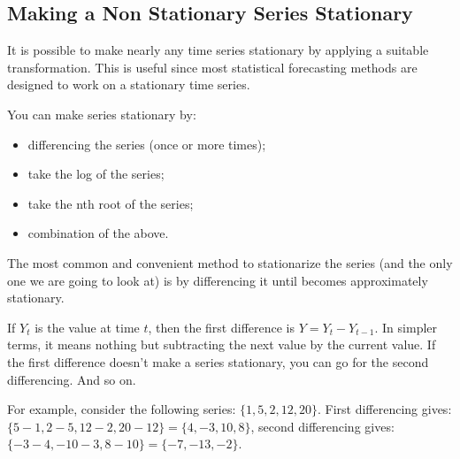 \subsection{Making a Non Stationary Series Stationary}
\label{making-a-non-stationary-series-stationary}

It is possible to make nearly any time series stationary by applying a
suitable transformation. This is useful since most statistical
forecasting methods are designed to work on a stationary time series.

You can make series stationary by:

\begin{itemize}
\tightlist
\item
  differencing the series (once or more times);
\item
  take the log of the series;
\item
  take the nth root of the series;
\item
  combination of the above.
\end{itemize}

The most common and convenient method to stationarize the series (and
the only one we are going to look at) is by differencing it 
until becomes approximately stationary.

If \(Y_t\) is the value at time \(t\), then the first difference is
\(Y = Y_t - Y_{t-1}\). In simpler terms, it means
nothing but subtracting the next value by the current value. If the
first difference doesn't make a series stationary, you can go for the
second differencing. And so on.

For example, consider the following series: $\{1, 5, 2, 12, 20\}$.
First differencing gives: $\{5-1, 2-5, 12-2, 20-12\} = \{4, -3, 10, 8\}$,
second differencing gives: $\{-3-4, -10-3, 8-10\} = \{-7, -13, -2\}$.

